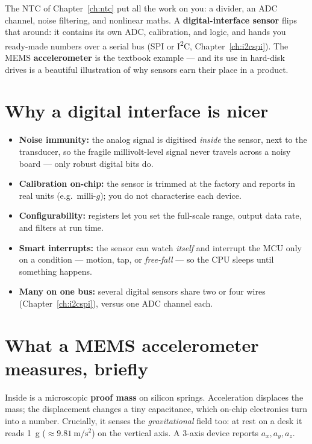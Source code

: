 \documentclass[11pt,a4paper,oneside]{book}
\begin{document}
The NTC of Chapter~\ref{ch:ntc} put all the work on you: a divider, an ADC
channel, noise filtering, and nonlinear maths. A \textbf{digital-interface
sensor} flips that around: it contains its own ADC, calibration, and logic, and
hands you ready-made numbers over a serial bus (SPI or I\textsuperscript{2}C,
Chapter~\ref{ch:i2cspi}). The MEMS \textbf{accelerometer} is the textbook
example --- and its use in hard-disk drives is a beautiful illustration of why
sensors earn their place in a product.

\section{Why a digital interface is nicer}
\begin{itemize}[leftmargin=1.4cm]
  \item \textbf{Noise immunity:} the analog signal is digitised \emph{inside}
        the sensor, next to the transducer, so the fragile millivolt-level
        signal never travels across a noisy board --- only robust digital bits
        do.
  \item \textbf{Calibration on-chip:} the sensor is trimmed at the factory and
        reports in real units (e.g.\ milli-$g$); you do not characterise each
        device.
  \item \textbf{Configurability:} registers let you set the full-scale range,
        output data rate, and filters at run time.
  \item \textbf{Smart interrupts:} the sensor can watch \emph{itself} and
        interrupt the MCU only on a condition --- motion, tap, or
        \emph{free-fall} --- so the CPU sleeps until something happens.
  \item \textbf{Many on one bus:} several digital sensors share two or four
        wires (Chapter~\ref{ch:i2cspi}), versus one ADC channel each.
\end{itemize}

\section{What a MEMS accelerometer measures, briefly}
Inside is a microscopic \textbf{proof mass} on silicon springs. Acceleration
displaces the mass; the displacement changes a tiny capacitance, which on-chip
electronics turn into a number. Crucially, it senses the \emph{gravitational}
field too: at rest on a desk it reads \qty{1}{g} (\(\approx\qty{9.81}{\meter\per\second\squared}\))
on the vertical axis. A 3-axis device reports $a_x, a_y, a_z$.
\end{document}
